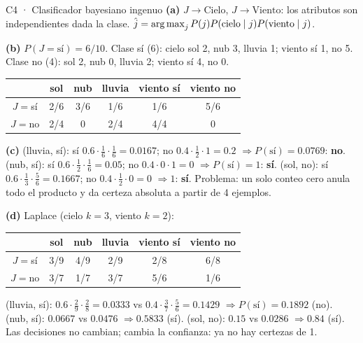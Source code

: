 \begin{solucion}{C4 · Clasificador bayesiano ingenuo}
\textbf{(a)} $J\to\text{Cielo}$, $J\to\text{Viento}$: los atributos son independientes dada la clase.
$\hat j=\operatorname*{arg\,max}_jP(j)P(\text{cielo}\mid j)P(\text{viento}\mid j)$.

\textbf{(b)} $P(J=\text{sí})=6/10$. Clase sí (6): cielo sol 2, nub 3, lluvia 1; viento sí 1, no 5. Clase no (4): sol 2, nub 0, lluvia 2; viento sí 4, no 0.
\begin{center}\small
\begin{tabular}{c|ccc|cc}
 & sol & nub & lluvia & viento sí & viento no\\\hline
$J=$sí & 2/6 & 3/6 & 1/6 & 1/6 & 5/6\\
$J=$no & 2/4 & 0 & 2/4 & 4/4 & 0
\end{tabular}
\end{center}

\textbf{(c)} (lluvia, sí): sí $0.6\cdot\frac16\cdot\frac16=0.0167$; no $0.4\cdot\frac12\cdot1=0.2$ $\Rightarrow P(\text{sí})=0.0769$: \textbf{no}.
(nub, sí): sí $0.6\cdot\frac12\cdot\frac16=0.05$; no $0.4\cdot0\cdot1=0$ $\Rightarrow P(\text{sí})=1$: \textbf{sí}.
(sol, no): sí $0.6\cdot\frac13\cdot\frac56=0.1667$; no $0.4\cdot\frac12\cdot0=0$ $\Rightarrow1$: \textbf{sí}.
Problema: un solo conteo cero anula todo el producto y da certeza absoluta a partir de 4 ejemplos.

\textbf{(d)} Laplace (cielo $k=3$, viento $k=2$):
\begin{center}\small
\begin{tabular}{c|ccc|cc}
 & sol & nub & lluvia & viento sí & viento no\\\hline
$J=$sí & 3/9 & 4/9 & 2/9 & 2/8 & 6/8\\
$J=$no & 3/7 & 1/7 & 3/7 & 5/6 & 1/6
\end{tabular}
\end{center}
(lluvia, sí): $0.6\cdot\frac29\cdot\frac28=0.0333$ vs $0.4\cdot\frac37\cdot\frac56=0.1429$ $\Rightarrow P(\text{sí})=\mathbf{0.1892}$ (no).
(nub, sí): $0.0667$ vs $0.0476$ $\Rightarrow\mathbf{0.5833}$ (sí).
(sol, no): $0.15$ vs $0.0286$ $\Rightarrow\mathbf{0.84}$ (sí).
Las decisiones no cambian; cambia la confianza: ya no hay certezas de 1.
\end{solucion}

